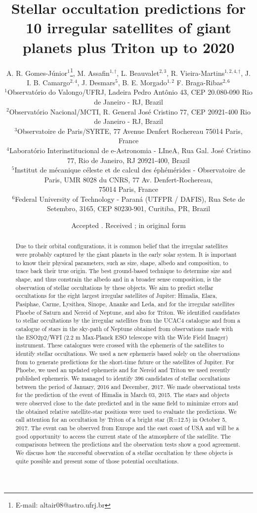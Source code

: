 \documentclass[useAMS,usenatbib]{mn2e}
\title[Predictions of stellar occultations by irregular satellites up to 2020]{Stellar occultation predictions for 10 irregular satellites of giant planets plus Triton up to 2020}
\author[A. R. Gomes-J\'unior, M. Assafin, L. Beauvalet et al.]{A. R. Gomes-J\'unior$^{1}$\thanks{E-mail: altair08@astro.ufrj.br},
M. Assafin$^{1,\dag}$,
L. Beauvalet$^{2,3}$,
R. Vieira-Martins$^{1,2,4,\dag}$,\newauthor
J. I. B. Camargo$^{2,4}$,
J. Desmars$^{5}$,
B. E. Morgado$^{1,2}$
F. Braga-Ribas$^{2,6}$
\\
$^{1}$Observat\'orio do Valongo/UFRJ, Ladeira Pedro Ant\^onio 43,
CEP 20.080-090 Rio de Janeiro - RJ, Brazil\\
$^{2}$Observat\'orio Nacional/MCTI, R. General Jos\'e Cristino 77, CEP 20921-400 Rio de Janeiro - RJ, Brazil\\
$^{3}$Observatoire de Paris/SYRTE, 77 Avenue Denfert Rochereau 75014 Paris, France\\
$^{4}$Laborat\'orio Interinstitucional de e-Astronomia - LIneA, Rua Gal. Jos\'e Cristino 77, Rio de Janeiro, RJ 20921-400, Brazil\\
$^{5}$Institut de m\'ecanique c\'eleste et de calcul des \'eph\'em\'erides - Observatoire de Paris, UMR 8028 du CNRS, 77 Av. Denfert-Rochereau,\\ 75014 Paris, France\\
$^{6}$Federal University of Technology - Paran\'a (UTFPR / DAFIS), Rua Sete de Setembro, 3165, CEP 80230-901, Curitiba, PR, Brazil
}
\begin{document}
\newcommand{\noccs}{396 } %

\date{Accepted . Received ; in original form }

\pagerange{\pageref{firstpage}--\pageref{lastpage}} 

\maketitle

\label{firstpage}

\begin{abstract}
Due to their orbital configurations, it is common belief that the irregular satellites were probably captured by the giant planets in the early solar system. It is important to know their physical parameters, such as size, shape, albedo and composition, to trace back their true origin. The best ground-based technique to determine size and shape, and thus constrain the albedo and in a broader sense composition, is the observation of stellar occultations by these objects.
We aim to predict stellar occultations for the eight largest irregular satellites of Jupiter: Himalia, Elara, Pasiphae, Carme, Lysithea, Sinope, Ananke and Leda, and for the irregular satellites Phoebe of Saturn and Nereid of Neptune, and also for Triton.
We identified candidates to stellar occultations by the irregular satellites from the UCAC4 catalogue and from a catalogue of stars in the sky-path of Neptune obtained from observations made with the ESO2p2/WFI (2.2 m Max-Planck ESO telescope with the Wide Field Imager) instrument. These catalogues were crossed with the ephemeris of the satellites to identify stellar occultations. We used a new ephemeris based solely on the observations from \cite{GomesJunior2015} to generate predictions for the short-time future or the satellites of Jupiter. For Phoebe, we used an updated ephemeris and for Nereid and Triton we used recently published ephemeris.
We managed to identify \noccs candidates of stellar occultations between the period of January, 2016 and December, 2017. We made observational tests for the prediction of the event of Himalia in March 03, 2015. The stars and objects were observed close to the date predicted and in the same field to minimize errors and the obtained relative satellite-star positions were used to evaluate the predictions. We call attention for an occultation by Triton of a bright star (R=12.5) in October 5, 2017. The event can be observed from Europe and the east coast of USA and will be a good opportunity to access the current state of the atmosphere of the satellite.
The comparisons between the predictions and the observation tests show a good agreement. We discuss how the successful observation of a stellar occultation by these objects is quite possible and present some of those potential occultations.
\end{abstract}
\end{document}
